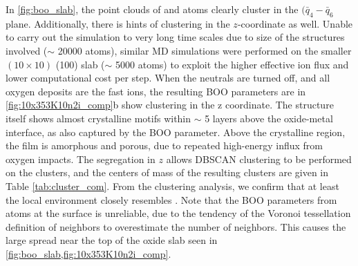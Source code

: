 \documentclass[manuscript=cmatex]{achemso}
\begin{document}
In \cref{fig:boo_slab}, the point clouds of  and  atoms clearly cluster in the $(\bar{q}_4-\bar{q}_6$ plane. Additionally, there is hints of clustering in the $z$-coordinate as well. Unable to carry out the simulation to very long time scales due to size of the structures involved ($\sim$ 20000 atoms), similar MD simulations were performed on the smaller $(10\times10)$  (100) slab ($\sim$ 5000 atoms) to exploit the higher effective ion flux and lower computational cost per step. When the neutrals are turned off, and all oxygen deposits are the fast ions, the resulting BOO parameters are in \cref{fig:10x353K10n2i_comp}b show clustering in the z coordinate. The structure itself shows almost crystalline  motifs within $\sim$ 5 layers above the oxide-metal interface, as also captured by the BOO parameter. Above the crystalline region, the film is amorphous and porous, due to repeated high-energy influx from oxygen impacts. The segregation in $z$ allows DBSCAN clustering to be performed on the clusters, and the centers of mass of the resulting clusters are given in Table \ref{tab:cluster_com}. From the clustering analysis, we confirm that at least the local environment closely resembles . Note that the BOO parameters from atoms at the surface is unreliable, due to the tendency of the Voronoi tessellation definition of neighbors to overestimate the number of neighbors. This causes the large spread near the top of the oxide slab seen in \cref{fig:boo_slab,fig:10x353K10n2i_comp}. 
\end{document}
